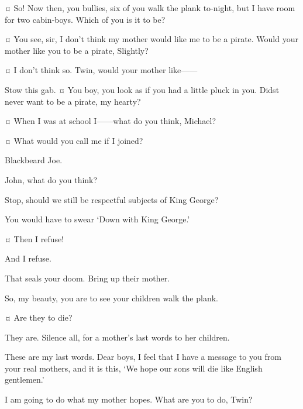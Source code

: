 \begin{drama}
\hookspeaks {}¤
So!
Now then, you bullies, six of you walk the plank to‐night, but I have room for two cabin‐boys.
Which of you is it to be?

\tootlesspeaks {}¤
You see, sir, I don’t think my mother would like me to be a pirate.
Would your mother like you to be a pirate, Slightly?

\slightlyspeaks {}¤
I don’t think so.
Twin, would your mother like——

\hookspeaks
Stow this gab.
¤
You boy, you look as if you had a little pluck in you.
Didst never want to be a pirate, my hearty?

\johnspeaks {}¤
When I was at school I——what do you think, Michael?

\michaelspeaks {}¤
What would you call me if I joined?

\hookspeaks
Blackbeard Joe.

\michaelspeaks
John, what do you think?

\johnspeaks
Stop, should we still be respectful subjects of King George?

\hookspeaks
You would have to swear ‘Down with King George.’

\johnspeaks {}¤
Then I refuse!

\michaelspeaks
And I refuse.

\hookspeaks
That seals your doom.
Bring up their mother.


So, my beauty, you are to see your children walk the plank.

\wendyspeaks {}¤
Are they to die?

\hookspeaks
They are.
Silence all, for a mother’s last words to her children.

\wendyspeaks
These are my last words.
Dear boys, I feel that I have a message to you from your real mothers, and it is this,
‘We hope our sons will die like English gentlemen.’


\tootlesspeaks
I am going to do what my mother hopes.
What are you to do, Twin?


\end{drama}
